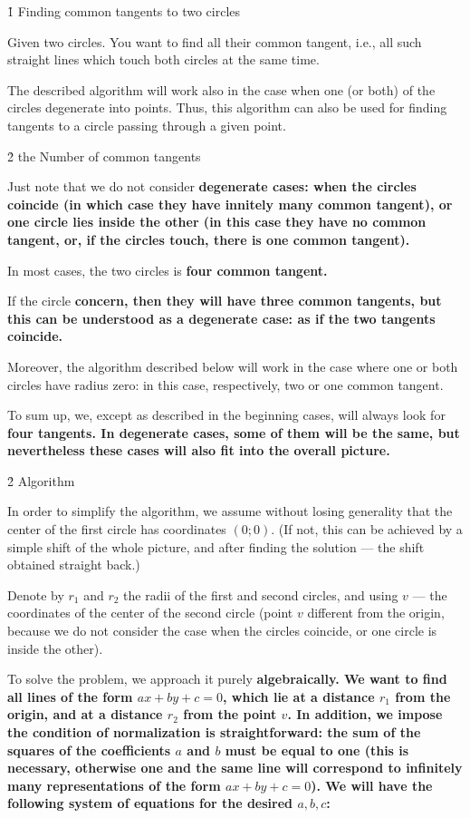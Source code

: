 \h1{ Finding common tangents to two circles }

Given two circles. You want to find all their common tangent, i.e., all such straight lines which touch both circles at the same time.

The described algorithm will work also in the case when one (or both) of the circles degenerate into points. Thus, this algorithm can also be used for finding tangents to a circle passing through a given point.


\h2{ the Number of common tangents }

Just note that we do not consider \bf{degenerate} cases: when the circles coincide (in which case they have innitely many common tangent), or one circle lies inside the other (in this case they have no common tangent, or, if the circles touch, there is one common tangent).

In most cases, the two circles is \bf{four} common tangent.

If the circle \bf{concern}, then they will have three common tangents, but this can be understood as a degenerate case: as if the two tangents coincide.

Moreover, the algorithm described below will work in the case where one or both circles have radius zero: in this case, respectively, two or one common tangent.

To sum up, we, except as described in the beginning cases, will always look for \bf{four tangents}. In degenerate cases, some of them will be the same, but nevertheless these cases will also fit into the overall picture.


\h2{ Algorithm }

In order to simplify the algorithm, we assume without losing generality that the center of the first circle has coordinates $(0;0)$. (If not, this can be achieved by a simple shift of the whole picture, and after finding the solution --- the shift obtained straight back.)

Denote by $r_1$ and $r_2$ the radii of the first and second circles, and using $v$ --- the coordinates of the center of the second circle (point $v$ different from the origin, because we do not consider the case when the circles coincide, or one circle is inside the other).

To solve the problem, we approach it purely \bf{algebraically}. We want to find all lines of the form $ax+by+c=0$, which lie at a distance $r_1$ from the origin, and at a distance $r_2$ from the point $v$. In addition, we impose the condition of normalization is straightforward: the sum of the squares of the coefficients $a$ and $b$ must be equal to one (this is necessary, otherwise one and the same line will correspond to infinitely many representations of the form $ax+by+c=0$). We will have the following system of equations for the desired $a,b,c$:

